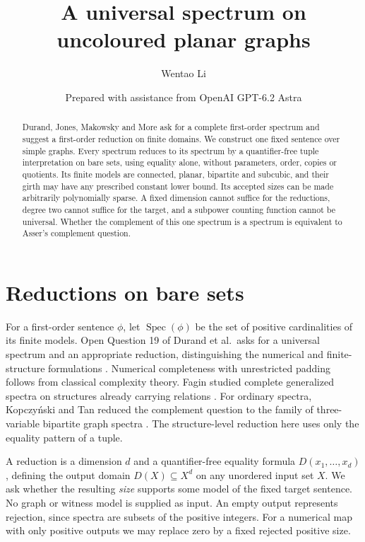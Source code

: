 \documentclass[11pt]{article}
\title{A universal spectrum on uncoloured planar graphs}
\author{Wentao Li}
\date{\small Prepared with assistance from OpenAI GPT-6.2 Astra}
\newcommand{\Spec}{\operatorname{Spec}}
\begin{document}
\maketitle
\begin{abstract}
Durand, Jones, Makowsky and More ask for a complete first-order spectrum and suggest a first-order reduction on finite domains. We construct one fixed sentence over simple graphs. Every spectrum reduces to its spectrum by a quantifier-free tuple interpretation on bare sets, using equality alone, without parameters, order, copies or quotients. Its finite models are connected, planar, bipartite and subcubic, and their girth may have any prescribed constant lower bound. Its accepted sizes can be made arbitrarily polynomially sparse. A fixed dimension cannot suffice for the reductions, degree two cannot suffice for the target, and a subpower counting function cannot be universal. Whether the complement of this one spectrum is a spectrum is equivalent to Asser's complement question.
\end{abstract}

\section{Reductions on bare sets}
For a first-order sentence $\phi$, let $\Spec(\phi)$ be the set of positive cardinalities of its finite models. Open Question 19 of Durand et al.\ asks for a universal spectrum and an appropriate reduction, distinguishing the numerical and finite-structure formulations \cite[p. 531]{survey}. Numerical completeness with unrestricted padding follows from classical complexity theory. Fagin studied complete generalized spectra on structures already carrying relations \cite{fagin}. For ordinary spectra, Kopczyński and Tan reduced the complement question to the family of three-variable bipartite graph spectra \cite{kt}. The structure-level reduction here uses only the equality pattern of a tuple.

A reduction is a dimension $d$ and a quantifier-free equality formula $D(x_1,\ldots,x_d)$, defining the output domain $D(X)\subseteq X^d$ on any unordered input set $X$. We ask whether the resulting \emph{size} supports some model of the fixed target sentence. No graph or witness model is supplied as input. An empty output represents rejection, since spectra are subsets of the positive integers. For a numerical map with only positive outputs we may replace zero by a fixed rejected positive size.
\end{document}
